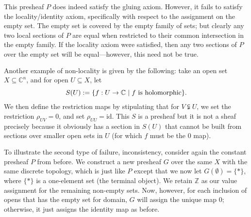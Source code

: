 \documentclass[a4paper]{book}
\theoremstyle{definition}
\theoremstyle{definition}
\theoremstyle{definition}
\theoremstyle{theorem}
\theoremstyle{definition}
\begin{document}
This presheaf $P$ does indeed satisfy the gluing axiom. However, it fails to satisfy the locality/identity axiom, specifically with respect to the assignment on the empty set. The empty set is covered by the empty family of sets; but clearly any two local sections of $P$ are equal when restricted to their common intersection in the empty family. If the locality axiom were satisfied, then any two sections of $P$ over the empty set will be equal---however, this need not be true.\par  
Another example of non-locality is given by the following: take an open set $X \subseteq \mathbb{C}^n$, and for open $U \subseteq X$, let
\begin{equation}
S(U) := \{f: U \rightarrow \mathbb{C} \hspace*{0.3em}| \hspace*{0.3em} f \text{ is holomorphic} \}.
\end{equation}      
We then define the restriction maps by stipulating that for $V \subsetneqq U$, we set the restriction $\rho_{UV} = 0$, and set $\rho_{UU} = \text{id}$. This $S$ is a presheaf but it is not a sheaf precisely because it obviously has a section in $S(U)$ that cannot be built from sections over smaller open sets in $U$ (for which $f$ must be the $0$ map).\par 
To illustrate the second type of failure, inconsistency, consider again the constant presheaf $P$ from before. We construct a new presheaf $G$ over the same $X$ with the same discrete topology, which is just like $P$ except that we now let $G(\emptyset) = \{*\}$, where $\{*\}$ is a one-element set (the terminal object). We retain $\mathbb{Z}$ as our value assignment for the remaining non-empty sets. Now, however, for each inclusion of opens that has the empty set for domain, $G$ will assign the unique map $0$; otherwise, it just assigns the identity map as before.
\begin{center} 
\end{center} 
\end{document}
